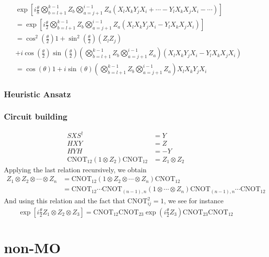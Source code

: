 \documentclass[11pt, oneside]{article}   	%
\begin{document}
\begin{align}
&\exp \left[ i \frac{\theta}{8} \bigotimes^{k-1}_{b=l+1} Z_b \bigotimes^{i-1}_{a=j+1} Z_a (X_l X_k Y_j X_i + \cdots - Y_l X_k X_j X_i - \cdots) \right] \\
& = \exp \left[ i \frac{\theta}{2} \bigotimes^{k-1}_{b=l+1} Z_b \bigotimes^{i-1}_{a=j+1} Z_a (X_l X_k Y_j X_i - Y_l X_k X_j X_i) \right] \\
&= \cos^2 \left( \frac{\theta}{2} \right) 1 + \sin^2 \left( \frac{\theta}{2} \right) (Z_l Z_j) \\
&+ i \cos \left( \frac{\theta}{2} \right) \sin \left( \frac{\theta}{2} \right) 
\left( \bigotimes^{k-1}_{b=l+1} Z_b \bigotimes^{i-1}_{a=j+1} Z_a \right) (X_l X_k Y_j X_i - Y_l X_k X_j X_i) \\
&= \cos (\theta) 1 + i \sin (\theta) \left( \bigotimes^{k-1}_{b=l+1} Z_b \bigotimes^{i-1}_{a=j+1} Z_a \right) X_l X_k Y_j X_i
\end{align}

\subsubsection{Heuristic Ansatz}

\subsubsection{Circuit building}
\begin{align}
S X S^{\dagger} &= Y \\
H X Y &= Z \\
H Y H &= -Y \\
\mathrm{CNOT}_{12} (1 \otimes Z_2) \mathrm{CNOT}_{12} &= Z_1 \otimes Z_2
\end{align}
Applying the last relation recursively, we obtain
\begin{align}
Z_1 \otimes Z_2 \otimes \cdots \otimes Z_n  
&= \mathrm{CNOT}_{12} (1 \otimes Z_2 \otimes \cdots \otimes Z_n ) \mathrm{CNOT}_{12} \\
&= \mathrm{CNOT}_{12} \cdots \mathrm{CNOT}_{(n-1), n} (1 \otimes \cdots \otimes Z_n ) \mathrm{CNOT}_{(n-1), n} \cdots \mathrm{CNOT}_{12} 
\end{align}
And using this relation and the fact that $\mathrm{CNOT}^2_{ij} = 1$, we see for instance
\begin{align}
\exp \left[ i \frac{\theta}{2} Z_1 \otimes Z_2 \otimes Z_3 \right] 
= \mathrm{CNOT}_{12} \mathrm{CNOT}_{23} \exp \left( i \frac{\theta}{2} Z_3 \right) \mathrm{CNOT}_{23} \mathrm{CNOT}_{12}
\end{align}

\section{non-MO}
\end{document}
